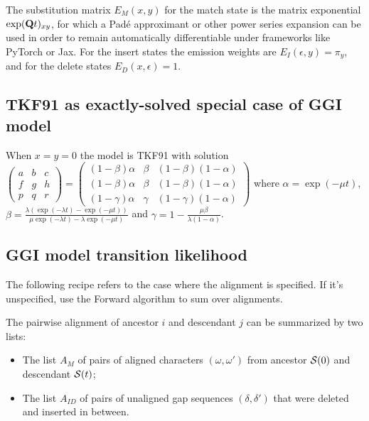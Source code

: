 \documentclass{article}
\begin{document}
The substitution matrix $E_M(x,y)$ for the match state is
the matrix exponential $\exp({\bf Q}t)_{xy}$, for which a Pad\'{e} approximant
or other power series expansion can be used in order to remain automatically differentiable under frameworks like PyTorch or Jax. %
For the insert states the emission weights are $E_I(\epsilon,y)=\pi_y$,
and for the delete states $E_D(x,\epsilon)=1$.

\subsection{TKF91 as exactly-solved special case of GGI model}

When $x=y=0$ the model is TKF91 \cite{ThorneEtAl91}
with solution
$
\begin{pmatrix}
a & b & c \\
f & g & h \\
p & q & r 
\end{pmatrix}
=
\begin{pmatrix}
(1-\beta)\alpha & \beta & (1-\beta)(1-\alpha) \\
(1-\beta)\alpha & \beta & (1-\beta)(1-\alpha) \\
(1-\gamma)\alpha & \gamma & (1-\gamma)(1-\alpha)
\end{pmatrix}
$
where
$\alpha = \exp(-\mu t)$,
$\beta = \frac{\lambda \left( \exp(-\lambda t) - \exp(-\mu t) \right)}{\mu \exp(-\lambda t) - \lambda \exp(-\mu t)}$
and
$\gamma = 1 - \frac{\mu \beta}{\lambda (1 - \alpha)}$.



\subsection{GGI model transition likelihood}

The following recipe refers to the case where the alignment is specified.
If it's unspecified, use the Forward algorithm to sum over alignments.

The pairwise alignment of ancestor $i$ and descendant $j$ can be summarized by two lists:
\begin{itemize}
    \item The list $A_M$ of pairs of aligned characters $(\omega,\omega')$ from ancestor ${\cal S}(0)$ and descendant ${\cal S}(t)$;
    \item The list $A_{ID}$ of pairs of unaligned gap sequences $(\delta,\delta')$ that were deleted and inserted in between.
\end{itemize}
\end{document}
